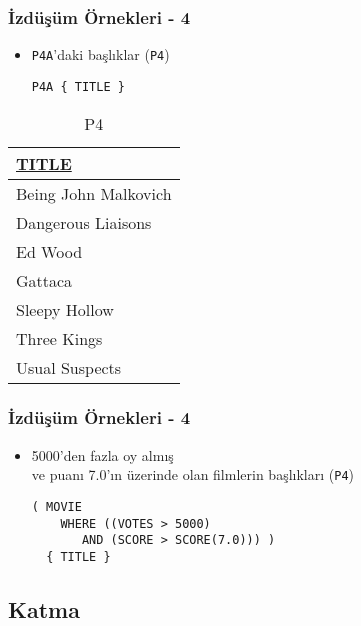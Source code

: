 \documentclass[dvipsnames]{beamer}
\theoremstyle{plain}
\begin{document}
\begin{frame}[fragile]
  \frametitle{İzdüşüm Örnekleri - 4}

    \begin{itemize}
      \item \texttt{P4A}'daki başlıklar (\texttt{P4})

    \begin{lstlisting}
P4A { TITLE }
    \end{lstlisting}
    \end{itemize}

    \vspace{-10pt}
    \begin{tiny}
    \begin{table}
      \caption{P4}
      \begin{tabular}{|l|}\hline
\underline{TITLE}   \\[2pt]\hline\hline
Being John Malkovich\\\hline
Dangerous Liaisons  \\\hline
Ed Wood             \\\hline
Gattaca             \\\hline
Sleepy Hollow       \\\hline
Three Kings         \\\hline
Usual Suspects      \\\hline
      \end{tabular}
    \end{table}
    \end{tiny}
\end{frame}

\begin{frame}[fragile]
  \frametitle{İzdüşüm Örnekleri - 4}

    \begin{itemize}
      \item 5000'den fazla oy almış\\
      ve puanı 7.0'ın üzerinde olan filmlerin başlıkları (\texttt{P4})
   

    \begin{lstlisting}
( MOVIE
    WHERE ((VOTES > 5000)
       AND (SCORE > SCORE(7.0))) )
  { TITLE }
    \end{lstlisting}
    \end{itemize}
\end{frame}

\subsection{Katma}
\end{document}
